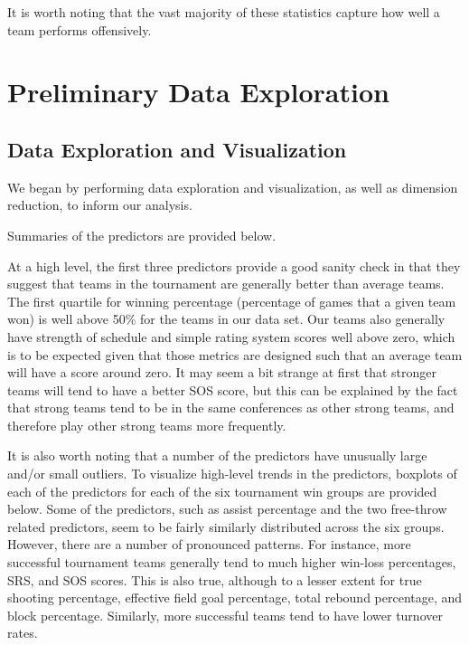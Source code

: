 \documentclass[10pt,a4paper, hidelinks]{article} %
\begin{document}
It is worth noting that the vast majority of these statistics capture how well a team performs offensively.  

\section{Preliminary Data Exploration}

\subsection{Data Exploration and Visualization}
We began by performing data exploration and visualization, as well as dimension reduction, to inform our analysis.

Summaries of the predictors are provided below.


At a high level, the first three predictors provide a good sanity check in that they suggest that  teams in the tournament are generally better than average teams. The first quartile for winning percentage (percentage of games that a given team won) is well above 50\% for the teams in our data set. Our teams also generally have strength of schedule and simple rating system scores well above zero, which is to be expected given that those metrics are designed such that an average team will have a score around zero. It may seem a bit strange at first that stronger teams will tend to have a better SOS score, but this can be explained by the fact that strong teams tend to be in the same conferences as other strong teams, and therefore play other strong teams more frequently.

It is also worth noting that a number of the predictors have unusually large and/or small outliers. To visualize high-level trends in the predictors, boxplots of each of the predictors for each of the six tournament win groups are provided below. Some of the predictors, such as assist percentage and the two free-throw related predictors, seem to be fairly similarly distributed across the six groups. However, there are a number of pronounced patterns. For instance, more successful tournament teams generally tend to much higher win-loss percentages, SRS, and SOS scores. This is also true, although to a lesser extent for true shooting percentage, effective field goal percentage, total rebound percentage, and block percentage. Similarly, more successful teams tend to have lower turnover rates. 

\end{document}
